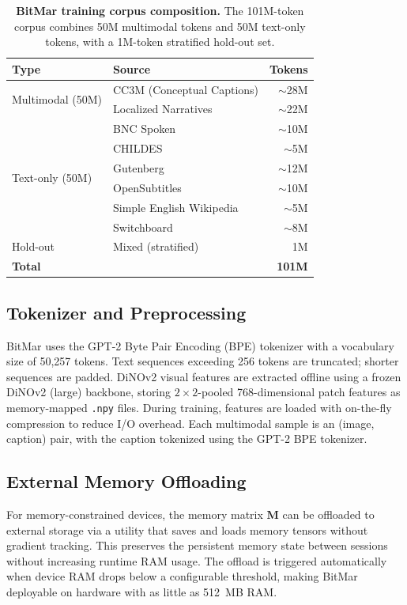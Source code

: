 \begin{table}[htbp]
\centering
\caption{\textbf{BitMar training corpus composition.} The 101M-token corpus combines 50M multimodal tokens and 50M text-only tokens, with a 1M-token stratified hold-out set.}
\label{tab:bitmar_dataset_stats}
\begin{tabular}{llr}
\toprule
\textbf{Type} & \textbf{Source} & \textbf{Tokens} \\
\midrule
\multirow{2}{*}{Multimodal (50M)} & CC3M (Conceptual Captions) & $\sim$28M \\
 & Localized Narratives & $\sim$22M \\
\midrule
\multirow{6}{*}{Text-only (50M)} & BNC Spoken & $\sim$10M \\
 & CHILDES & $\sim$5M \\
 & Gutenberg & $\sim$12M \\
 & OpenSubtitles & $\sim$10M \\
 & Simple English Wikipedia & $\sim$5M \\
 & Switchboard & $\sim$8M \\
\midrule
Hold-out & Mixed (stratified) & 1M \\
\midrule
\textbf{Total} & & \textbf{101M} \\
\bottomrule
\end{tabular}
\end{table}

\subsection{Tokenizer and Preprocessing}

BitMar uses the GPT-2 Byte Pair Encoding (BPE) tokenizer with a vocabulary size of 50{,}257 tokens. Text sequences exceeding 256 tokens are truncated; shorter sequences are padded. DiNOv2 visual features are extracted offline using a frozen DiNOv2 (large) backbone, storing $2\times2$-pooled 768-dimensional patch features as memory-mapped \texttt{.npy} files. During training, features are loaded with on-the-fly compression to reduce I/O overhead. Each multimodal sample is an (image, caption) pair, with the caption tokenized using the GPT-2 BPE tokenizer.

\subsection{External Memory Offloading}

For memory-constrained devices, the memory matrix $\mathbf{M}$ can be offloaded to external storage via a utility that saves and loads memory tensors without gradient tracking. This preserves the persistent memory state between sessions without increasing runtime RAM usage. The offload is triggered automatically when device RAM drops below a configurable threshold, making BitMar deployable on hardware with as little as 512~MB RAM.

